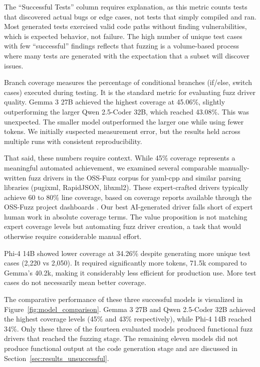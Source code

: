 The ``Successful Tests'' column requires explanation, as this metric counts tests that discovered actual bugs or edge cases, not tests that simply compiled and ran. Most generated tests exercised valid code paths without finding vulnerabilities, which is expected behavior, not failure. The high number of unique test cases with few ``successful'' findings reflects that fuzzing is a volume-based process where many tests are generated with the expectation that a subset will discover issues.

Branch coverage measures the percentage of conditional branches (if/else, switch cases) executed during testing. It is the standard metric for evaluating fuzz driver quality. Gemma 3 27B achieved the highest coverage at 45.06\%, slightly outperforming the larger Qwen 2.5-Coder 32B, which reached 43.08\%. This was unexpected. The smaller model outperformed the larger one while using fewer tokens. We initially suspected measurement error, but the results held across multiple runs with consistent reproducibility.

That said, these numbers require context. While 45\% coverage represents a meaningful automated achievement, we examined several comparable manually-written fuzz drivers in the OSS-Fuzz corpus for yaml-cpp and similar parsing libraries (pugixml, RapidJSON, libxml2). These expert-crafted drivers typically achieve 60 to 80\% line coverage, based on coverage reports available through the OSS-Fuzz project dashboards \cite{OSSFuzzBugs2021}. Our best AI-generated driver falls short of expert human work in absolute coverage terms. The value proposition is not matching expert coverage levels but automating fuzz driver creation, a task that would otherwise require considerable manual effort.

Phi-4 14B showed lower coverage at 34.26\% despite generating more unique test cases (2,220 vs 2,050). It required significantly more tokens, 71.5k compared to Gemma's 40.2k, making it considerably less efficient for production use. More test cases do not necessarily mean better coverage.

The comparative performance of these three successful models is visualized in Figure~\ref{fig:model_comparison}. Gemma 3 27B and Qwen 2.5-Coder 32B achieved the highest coverage levels (45\% and 43\% respectively), while Phi-4 14B reached 34\%. Only these three of the fourteen evaluated models produced functional fuzz drivers that reached the fuzzing stage. The remaining eleven models did not produce functional output at the code generation stage and are discussed in Section~\ref{sec:results_unsuccessful}.

